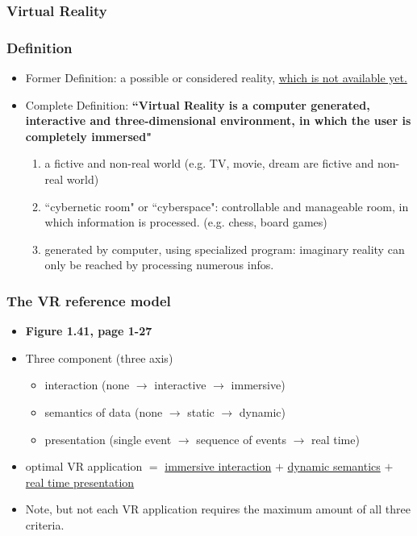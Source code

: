 \documentclass{standalone}
\begin{document}
\subsubsection{Virtual Reality}

\subsubsection*{Definition}

\begin{itemize}
	\item Former Definition: a possible or considered reality, \underline{which is not available yet.}
	\item Complete Definition: \textbf{``Virtual Reality is a computer generated, interactive and three-dimensional environment, in which the user is completely immersed"}
		\begin{enumerate}
			\item a fictive and non-real world (e.g. TV, movie, dream are fictive and non-real world)
			\item ``cybernetic room" or ``cyberspace": controllable and manageable room, in which information is processed. (e.g. chess, board games)
			\item generated by computer, using specialized program: imaginary reality can only be reached by processing numerous infos. 
		\end{enumerate}
\end{itemize}

\subsubsection*{The VR reference model}

\begin{itemize}
	\item \textbf{Figure 1.41, page 1-27}
	\item Three component (three axis)
		\begin{itemize} 
			\item interaction (none $\rightarrow$ interactive $\rightarrow$ immersive)
			\item semantics of data (none $\rightarrow$ static $\rightarrow$ dynamic)
			\item presentation (single event $\rightarrow$ sequence of events $\rightarrow$ real time)
		\end{itemize}
	\item optimal VR application $=$ \underline{immersive interaction} $+$ \underline{dynamic semantics} $+$ \underline{real time presentation} 
	\item Note, but not each VR application requires the maximum amount of all three criteria.
\end{itemize}
\end{document}
